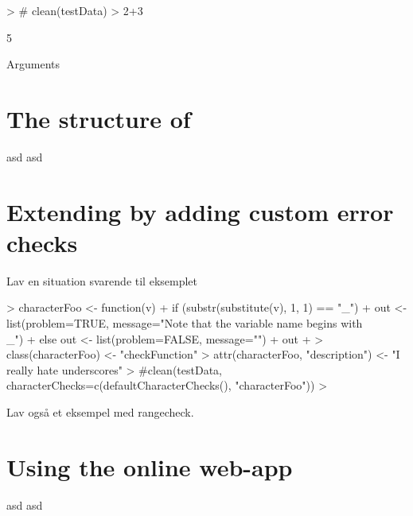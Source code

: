\documentclass[article]{jss}
\begin{document}
\begin{Schunk}
\begin{Sinput}
>                                         # clean(testData)
> 2+3
\end{Sinput}
\begin{Soutput}
[1] 5
\end{Soutput}
\end{Schunk}


% 

Arguments

\section{The structure of } \label{sec:internals}

asd
asd


\section{Extending  by adding custom error checks} \label{sec:extending}

Lav en situation svarende til eksemplet

\begin{Schunk}
\begin{Sinput}
> characterFoo <- function(v) {
+     if (substr(substitute(v), 1, 1) == "_") {
+         out <- list(problem=TRUE, message="Note that the variable name begins with \\_")
+     } else out <- list(problem=FALSE, message="")
+     out
+ }
> class(characterFoo) <- "checkFunction"
> attr(characterFoo, "description") <- "I really hate underscores"
> #clean(testData, characterChecks=c(defaultCharacterChecks(), "characterFoo"))
> 
\end{Sinput}
\end{Schunk}


Lav også et eksempel med rangecheck.




\section{Using the online web-app} \label{sec:web-app}

asd
asd
\end{document}
